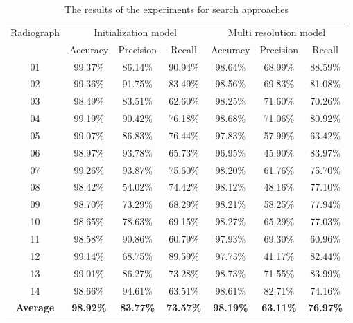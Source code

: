 \documentclass[a4paper]{article}
\begin{document}
\begin{table}[!tpb]
\centering
\begin{tabular}{|c|c|c|c|c|c|c|}
\cline{1-7}
Radiograph & \multicolumn{3}{c|}{Initialization model} & \multicolumn{3}{c|}{Multi resolution model} \\ \cline{1-7} 
  & Accuracy & Precision & Recall & Accuracy & Precision & Recall \\ \cline{1-7} 
01 & 99.37\% & 86.14\% & 90.94\%  & 98.64\%   & 68.99\% & 88.59\% \\ \cline{1-7} 
02 & 99.36\% & 91.75\% & 83.49\%  & 98.56\%   & 69.83\% & 81.08\% \\ \cline{1-7} 
03 & 98.49\% & 83.51\% & 62.60\%  & 98.25\%   & 71.60\% & 70.26\% \\ \cline{1-7} 
04 & 99.19\% & 90.42\% & 76.18\%  & 98.68\%   & 71.06\% & 80.92\% \\ \cline{1-7} 
05 & 99.07\% & 86.83\% & 76.44\%  & 97.83\%   & 57.99\% & 63.42\% \\ \cline{1-7} 
06 & 98.97\% & 93.78\% & 65.73\%  & 96.95\%   & 45.90\% & 83.97\% \\ \cline{1-7} 
07 & 99.26\% & 93.87\% & 75.60\%  & 98.20\%   & 61.76\% & 75.70\% \\ \cline{1-7} 
08 & 98.42\% & 54.02\% & 74.42\%  & 98.12\%   & 48.16\% & 77.10\% \\ \cline{1-7} 
09 & 98.70\% & 73.29\% & 68.29\%  & 98.21\%   & 58.25\% & 77.94\% \\ \cline{1-7} 
10 & 98.65\% & 78.63\% & 69.15\%  & 98.27\%   & 65.29\% & 77.03\% \\ \cline{1-7} 
11 & 98.58\% & 90.86\% & 60.79\%  & 97.93\%   & 69.30\% & 60.96\% \\ \cline{1-7} 
12 & 99.14\% & 68.75\% & 89.59\%  & 97.73\%   & 41.17\% & 82.44\% \\ \cline{1-7} 
13 & 99.01\% & 86.27\% & 73.28\%  & 98.73\%   & 71.55\% & 83.99\% \\ \cline{1-7} 
14 & 98.66\% & 94.61\% & 63.51\%  & 98.61\%   & 82.71\% & 74.16\% \\ \cline{1-7} 
\textbf{Average} & \textbf{98.92\%} & \textbf{83.77\%} & \textbf{73.57\%} & \textbf{98.19\%} & \textbf{63.11\%} & \textbf{76.97\%}\\
\hline
\end{tabular}
\caption{The results of the experiments for search approaches}
\label{tab:experiments-results}
\end{table}
\end{document}
